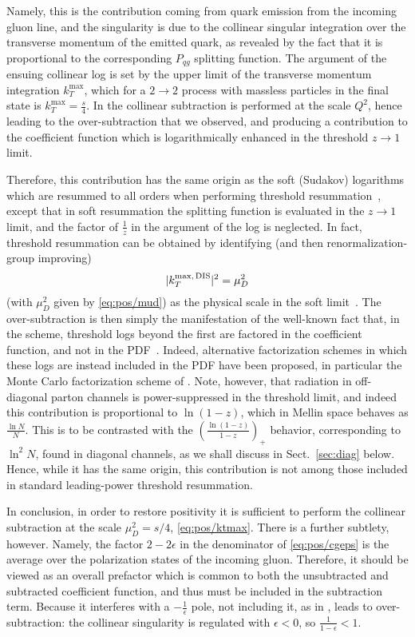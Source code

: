Namely, this is the
contribution coming from quark emission from the incoming gluon line,
and the singularity is due to the collinear singular integration over
the transverse momentum of the emitted quark, as revealed by the fact
that it is proportional to the corresponding $P_{qg}$ splitting
function. The argument of the ensuing collinear log is set by the
upper limit of the transverse momentum integration $k_T^{\textrm{max}}$,
which for a $2\to2$ process with massless particles in the final state
is $k_T^{\textrm{max}}=\frac{s}{4}$. In \msbar{}
the collinear subtraction is performed at the scale $Q^2$,
hence leading to the over-subtraction that we observed, and producing
a contribution to the coefficient function which is logarithmically
enhanced in the threshold $z\to1$ limit.

Therefore, this contribution has the same origin as the soft (Sudakov)
logarithms 
which are resummed to all orders
when performing threshold
resummation~\cite{Catani:1989ne,Sterman:1986aj}, except that 
in soft resummation the splitting function is evaluated in the $z\to1$
limit, and the factor of $\frac{1}{z}$ in the argument of the log is
neglected.
In fact, threshold resummation can be
obtained by identifying (and then
renormalization-group improving)
\begin{equation}\label{eq:pos/ktmax}
 |k_T^{\textrm{max,\,DIS}}|^2=\mu_D^2
\end{equation}
(with $\mu_D^2$ given by \cref{eq:pos/mud})
  as the physical
scale in the soft limit~\cite{Forte:2002ni}. The over-subtraction is then
simply the manifestation of the well-known fact that, in the \msbar{} scheme,
threshold logs beyond the first are factored in the coefficient
function, and not in the PDF~\cite{Albino:2000cp}. Indeed, alternative
factorization schemes in which these logs are instead included in the
PDF have been proposed, in particular  the Monte Carlo
factorization scheme of \cite{Jadach:2016acv}. Note, however, that
radiation in off-diagonal parton channels is power-suppressed in the
threshold limit, and indeed this contribution is proportional to
$\ln(1-z)$, which in Mellin space behaves as $\frac{\ln N}{N}$. This is to be
contrasted with the $\left(\frac{\ln(1-z)}{1-z}\right)_+$ behavior, corresponding to 
$\ln^2 N$, found in diagonal channels, as we shall discuss in
Sect.~\ref{sec:diag} below. Hence, while it has the same origin, this
contribution is not among those included in standard leading-power
threshold resummation. 

In conclusion,  in order to
restore positivity it is  sufficient to perform the collinear
subtraction at the scale $\mu_D^2=s/4$, \cref{eq:pos/ktmax}.
There is a further subtlety, however. Namely, the factor $2-2\epsilon$
in the denominator of \cref{eq:pos/cgeps} is the average over the
polarization states of the incoming gluon. Therefore, it should be
viewed as an overall prefactor which is common to both the
unsubtracted and subtracted coefficient function, and thus  must be
included in the subtraction term. Because it interferes with a
$-\frac{1}{\epsilon}$ pole, not including it, as in \msbar{}, leads to
over-subtraction: 
the collinear singularity is regulated with
$\epsilon<0$, so $\frac{1}{1-\epsilon}<1$.  

